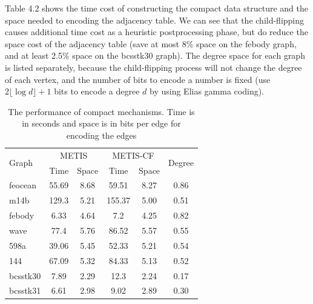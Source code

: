 \documentclass[12pt,glossary]{dalthesis}
\begin{document}
\bigskip
\bigskip


Table 4.2 shows the time cost of constructing the compact data structure and the space needed to encoding the adjacency table. We can see that the child-flipping causes additional time cost as a heuristic postprocessing phase, but do reduce the space cost of the adjacency table (save at most 8\% space on the febody graph, and at least 2.5\% space on the bcsstk30 graph). The degree space for each graph is listed separately, because the child-flipping process will not change the degree of each vertex, and the number of bits to encode a number is fixed (use $2\lfloor \log d \rfloor + 1$ bits to encode a degree $d$ by using Elias gamma coding).   

\begin{table}[]
\centering
\caption{The performance of compact mechanisms. Time is in seconds and space is in bits per edge for encoding the edges}
\label{compact-performance}
\begin{tabular}{|l||c|c||c|c||c|}
\cline{2-6}
\hline
\multirow{2}{*}{Graph} & \multicolumn{2}{c||}{METIS} & \multicolumn{2}{c||}{METIS-CF} & \multirow{2}{*}{Degree} \\ \cline{2-5}
                       & Time          & Space        & Time           & Space         &                         \\ \cline{6-6} \hline
feocean                & 55.69         & 8.68         & 59.51          & 8.27          & 0.86                    \\
m14b                   & 129.3         & 5.21         & 155.37         & 5.00          & 0.51                    \\
febody                 & 6.33          & 4.64         & 7.2            & 4.25          & 0.82                    \\
wave                   & 77.4          & 5.76         & 86.52          & 5.57          & 0.55                    \\
598a                   & 39.06         & 5.45         & 52.33          & 5.21          & 0.54                    \\
144                    & 67.09         & 5.32         & 84.33          & 5.13          & 0.52                    \\
bcsstk30               & 7.89          & 2.29         & 12.3           & 2.24          & 0.17                    \\
bcsstk31               & 6.61          & 2.98         & 9.02           & 2.89          & 0.30                    \\ \hline
\end{tabular}
\end{table}
\end{document}

